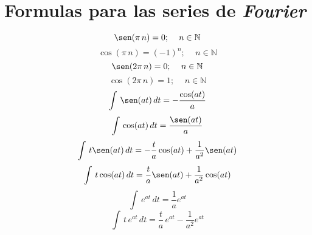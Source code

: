 \section{Formulas para las series de \emph{Fourier}}
\begin{equation*}
    \sen(\pi\,n)=0;\quad\,n\in\mathbb{N}
\end{equation*}
\begin{equation*}
    \cos(\pi\,n)={(-1)}^n;\quad\,n\in\mathbb{N}
\end{equation*}
\begin{equation*}
    \sen(2\pi\,n)=0;\quad\,n\in\mathbb{N}
\end{equation*}
\begin{equation*}
    \cos(2\pi\,n)=1;\quad\,n\in\mathbb{N}
\end{equation*}
\begin{equation*}
    \int\,\sen(at)\,dt=-\frac{\cos(at)}{a}
\end{equation*}
\begin{equation*}
    \int\,\cos(at)\,dt=\frac{\sen(at)}{a}
\end{equation*}
\begin{equation*}
    \int\,t\sen(at)\,dt=-\frac{t}{a}\cos(at)+\frac{1}{a^2}\sen(at)
\end{equation*}
\begin{equation*}
    \int\,t\cos(at)\,dt=\frac{t}{a}\sen(at)+\frac{1}{a^2}\cos(at)
\end{equation*}
\begin{equation*}
    \int\,{e}^{at}\,dt=\frac{1}{a}e^{at}
\end{equation*}
\begin{equation*}
    \int\,t\,{e}^{at}\,dt=\frac{t}{a}\,{e}^{at}-\frac{1}{a^2}{e}^{at}
\end{equation*}

